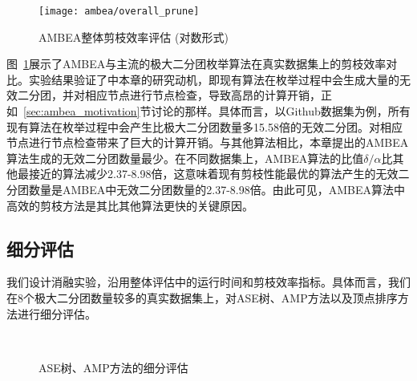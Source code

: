 \begin{figure} [H]
  \centering
  \texttt{[image: ambea/overall\_prune]}
  \caption{AMBEA整体剪枝效率评估 (对数形式)}
  \label{fig:ambea_overall_prune}
\end{figure}

图~\ref{fig:ambea_overall_prune}展示了AMBEA与主流的极大二分团枚举算法在真实数据集上的剪枝效率对比。实验结果验证了中本章的研究动机，即现有算法在枚举过程中会生成大量的无效二分团，并对相应节点进行节点检查，导致高昂的计算开销，正如~\ref{sec:ambea_motivation}节讨论的那样。具体而言，以Github数据集为例，所有现有算法在枚举过程中会产生比极大二分团数量多15.58倍的无效二分团。对相应节点进行节点检查带来了巨大的计算开销。与其他算法相比，本章提出的AMBEA算法生成的无效二分团数量最少。在不同数据集上，AMBEA算法的比值$\delta/\alpha$比其他最接近的算法减少2.37-8.98倍，这意味着现有剪枝性能最优的算法产生的无效二分团数量是AMBEA中无效二分团数量的2.37-8.98倍。由此可见，AMBEA算法中高效的剪枝方法是其比其他算法更快的关键原因。

\subsection{细分评估}

我们设计消融实验，沿用整体评估中的运行时间和剪枝效率指标。具体而言，我们在8个极大二分团数量较多的真实数据集上，对ASE树、AMP方法以及顶点排序方法进行细分评估。


\begin{figure} [H]
	\centering
  \vspace{0.05in}
  \\
  \vspace{0.05in}
	\caption{ASE树、AMP方法的细分评估}
	\label{fig:ambea_opt}
\end{figure}




